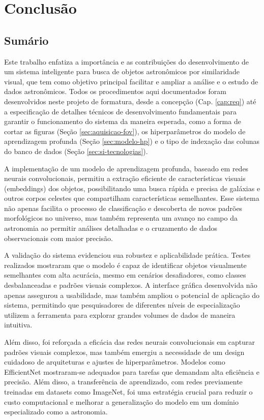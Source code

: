 \section{Conclusão}
\label{cap:conclusao}


\subsection{Sumário}
Este trabalho enfatiza a importância e as contribuições do desenvolvimento de um sistema inteligente para busca de objetos astronômicos por similaridade visual, que tem como objetivo principal facilitar e ampliar a análise e o estudo de dados astronômicos. Todos os procedimentos aqui documentados foram desenvolvidos neste projeto de formatura, desde a concepção (Cap. \ref{cap:req}) até a especificação de detalhes técnicos de desenvolvimento fundamentais para garantir o funcionamento do sistema da maneira esperada, como a forma de cortar as figuras (Seção \ref{sec:aquisicao-fov}), os hiperparâmetros do modelo de aprendizagem profunda (Seção \ref{sec:modelo-hp}) e o tipo de indexação das colunas do banco de dados (Seção \ref{sec:si-tecnologias}).

A implementação de um modelo de aprendizagem profunda, baseado em redes neurais convolucionais, permitiu a extração eficiente de características visuais (embeddings) dos objetos, possibilitando uma busca rápida e precisa de galáxias e outros corpos celestes que compartilham características semelhantes. Esse sistema não apenas facilita o processo de classificação e descoberta de novos padrões morfológicos no universo, mas também representa um avanço no campo da astronomia ao permitir análises detalhadas e o cruzamento de dados observacionais com maior precisão.

A validação do sistema evidenciou sua robustez e aplicabilidade prática. Testes realizados  mostraram que o modelo é capaz de identificar objetos visualmente semelhantes com alta acurácia, mesmo em cenários desafiadores, como classes desbalanceadas e padrões visuais complexos. A interface gráfica desenvolvida não apenas assegurou a usabilidade, mas também ampliou o potencial de aplicação do sistema, permitindo que pesquisadores de diferentes níveis de especialização utilizem a ferramenta para explorar grandes volumes de dados de maneira intuitiva.

Além disso, foi reforçada a eficácia das redes neurais convolucionais em capturar padrões visuais complexos, mas também emergiu a necessidade de um design cuidadoso de arquiteturas e ajustes de hiperparâmetros. Modelos como EfficientNet mostraram-se adequados para tarefas que demandam alta eficiência e precisão. Além disso, a transferência de aprendizado, com redes previamente treinadas em datasets como ImageNet, foi uma estratégia crucial para reduzir o custo computacional e melhorar a generalização do modelo em um domínio especializado como a astronomia.

